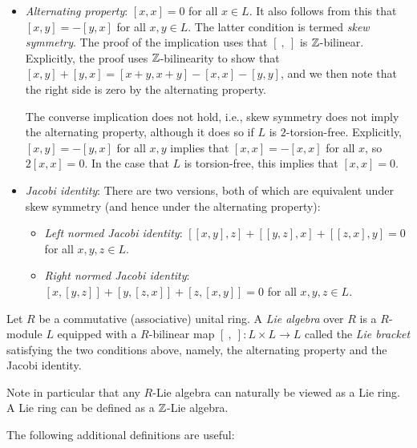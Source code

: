 \begin{itemize}
\item {\em Alternating property}: $[x,x] = 0$ for all $x \in L$. It
  also follows from this that $[x,y] = -[y,x]$ for all $x,y \in
  L$. The latter condition is termed {\em skew symmetry}. The proof of
  the implication uses that $[ \ , \ ]$ is $\mathbb{Z}$-bilinear. Explicitly,
  the proof uses $\mathbb{Z}$-bilinearity to show that $[x,y] + [y,x] =
  [x+y,x+y] - [x,x] - [y,y]$, and we then note that the right side is
  zero by the alternating property.

  The converse implication does not hold, i.e., skew symmetry does not
  imply the alternating property, although it does so if $L$ is
  $2$-torsion-free. Explicitly, $[x,y] = -[y,x]$ for all $x,y$ implies
  that $[x,x] = -[x,x]$ for all $x$, so $2[x,x] = 0$. In the case that
  $L$ is torsion-free, this implies that $[x,x] = 0$.
\item {\em Jacobi identity}: There are two versions, both of which are
  equivalent under skew symmetry (and hence under the alternating
  property):
  \begin{itemize}
  \item {\em Left normed Jacobi identity}: $[[x,y],z] + [[y,z],x] +
    [[z,x],y] = 0$ for all $x,y,z \in L$.
  \item {\em Right normed Jacobi identity}: $[x,[y,z]] + [y,[z,x]] +
    [z,[x,y]] = 0$ for all $x,y,z \in L$.
  \end{itemize}
\end{itemize}

Let $R$ be a commutative (associative) unital ring. A {\em Lie
  algebra} over $R$ is a $R$-module $L$ equipped with a $R$-bilinear
map $[ \ , \ ]:L \times L \to L$ called the {\em Lie bracket}
satisfying the two conditions above, namely, the alternating property
and the Jacobi identity.

Note in particular that any $R$-Lie algebra can naturally be viewed as
a Lie ring. A Lie ring can be defined as a $\mathbb{Z}$-Lie algebra.

The following additional definitions are useful:

